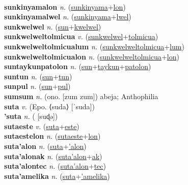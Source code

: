  \label{sunkinyamales} \\
\textbf{sunkinyamalon} \textit{n.} (\hyperref[sunkinyama]{sunkinyama}+\hyperref[lon]{lon})
 \label{sunkinyamalon} \\
\textbf{sunkinyamalwel} \textit{n.} (\hyperref[sunkinyama]{sunkinyama}+\hyperref[lwel]{lwel})
 \label{sunkinyamalwel} \\
\textbf{sunkwelwel} \textit{n.} (\hyperref[sun]{sun}+\hyperref[kwelwel]{kwelwel})
 \label{sunkwelwel} \\
\textbf{sunkwelweltolmicua} \textit{v.} (\hyperref[sunkwelwel]{sunkwelwel}+\hyperref[tolmicua]{tolmicua})
 \label{sunkwelweltolmicua} \\
\textbf{sunkwelweltolmicualum} \textit{n.} (\hyperref[sunkwelweltolmicua]{sunkwelweltolmicua}+\hyperref[lum]{lum})
 \label{sunkwelweltolmicualum} \\
\textbf{sunkwelweltolmicualon} \textit{n.} (\hyperref[sunkwelweltolmicua]{sunkwelweltolmicua}+\hyperref[lon]{lon})
 \label{sunkwelweltolmicualon} \\
\textbf{suntaykunpatolon} \textit{n.} (\hyperref[sun]{sun}+\hyperref[taykun]{taykun}+\hyperref[patolon]{patolon})
 \label{suntaykunpatolon} \\
\textbf{suntun} \textit{n.} (\hyperref[sun]{sun}+\hyperref[tun]{tun})
 \label{suntun} \\
\textbf{sunpul} \textit{n.} (\hyperref[sun]{sun}+\hyperref[pul]{pul})
 \label{sunpul} \\
\textbf{sumsum} \textit{n.} (ono. [zum zum])
abeja; Anthophilia \label{sumsum} \\
\textbf{suta} \textit{v.} (Epo. ⟨suda⟩ [ˈsuda])
 \label{suta} \\
\textbf{'suta} \textit{n.} ( [suɖə])
 \label{'suta} \\
\textbf{sutaeste} \textit{v.} (\hyperref[suta]{suta}+\hyperref[este]{este})
 \label{sutaeste} \\
\textbf{sutaestelon} \textit{n.} (\hyperref[sutaeste]{sutaeste}+\hyperref[lon]{lon})
 \label{sutaestelon} \\
\textbf{suta'alon} \textit{n.} (\hyperref[suta]{suta}+\hyperref['alon]{'alon})
 \label{suta'alon} \\
\textbf{suta'alonak} \textit{n.} (\hyperref[suta'alon]{suta'alon}+\hyperref[ak]{ak})
 \label{suta'alonak} \\
\textbf{suta'alontec} \textit{n.} (\hyperref[suta'alon]{suta'alon}+\hyperref[tec]{tec})
 \label{suta'alontec} \\
\textbf{suta'amelika} \textit{n.} (\hyperref[suta]{suta}+\hyperref['amelika]{'amelika})
